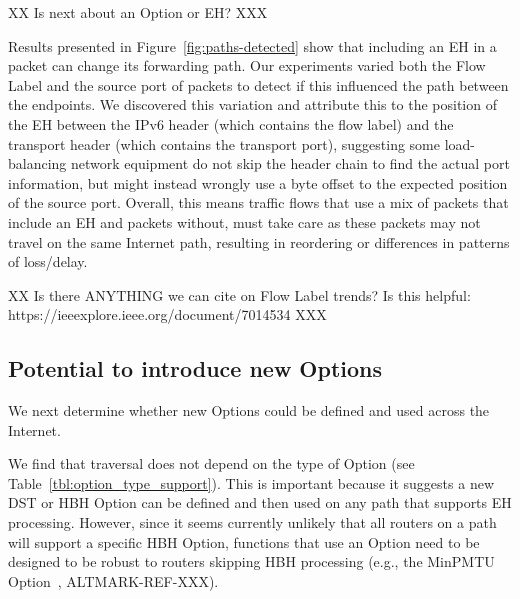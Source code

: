 \documentclass[conference]{IEEEtran}
\begin{document}

XX Is next about an Option or EH? XXX

Results presented in Figure~\ref{fig:paths-detected} show that including an EH in a packet can change its forwarding path. Our experiments varied both the Flow Label and the source port of packets to detect if this influenced the path between the endpoints. We discovered this variation and attribute this to the position of the EH between the IPv6 header (which contains the flow label) and the transport header (which contains the transport port), suggesting some load-balancing network equipment do not skip the header chain to find the actual port information, but might instead wrongly use a byte offset to the expected position of the source port. Overall, this means traffic flows that use a mix of packets that include an EH and packets without, must take care as these packets may not travel on the same Internet path, resulting in reordering or differences in patterns of loss/delay. 

XX Is there ANYTHING we can cite on Flow Label trends? Is this helpful: https://ieeexplore.ieee.org/document/7014534  XXX

\subsection{Potential to introduce new Options}

We next determine whether new Options could be defined and used across the Internet.

We find that traversal does not depend on the type of Option  (see Table~\ref{tbl:option_type_support}). This is important because it suggests a new DST or HBH Option can be defined and then used on any path that supports EH processing. 
However, since it seems currently unlikely that all routers on a path will support a specific HBH Option, functions that use an Option need to be designed to be robust to routers skipping HBH processing (e.g., the MinPMTU  Option~\cite{rfc9268}, ALTMARK-REF-XXX). 
\end{document}
